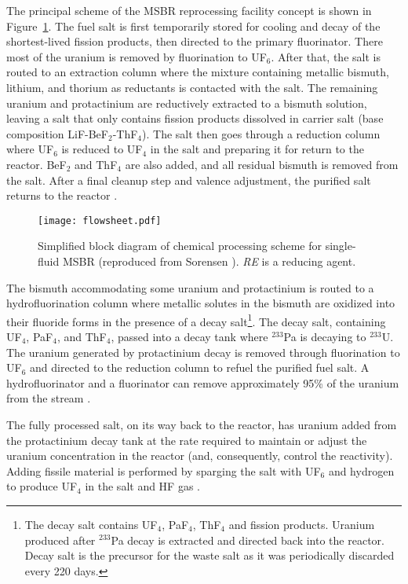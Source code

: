 The principal scheme of the \gls{MSBR} reprocessing facility concept is shown 
in Figure~\ref{fig:material_flow}. The fuel salt is first temporarily stored 
for cooling and decay of the shortest-lived fission products, then directed to 
the primary fluorinator. There most of the uranium is removed by fluorination 
to UF$_6$. After that, the salt is routed to an extraction column where the 
mixture containing metallic bismuth, lithium, and thorium as reductants is 
contacted with the salt. The remaining uranium and protactinium are 
reductively extracted to a bismuth solution, leaving a salt that only contains 
fission products dissolved in carrier salt (base composition 
LiF-BeF$_2$-ThF$_4$). The salt then goes through a reduction column where 
UF$_6$ is reduced to UF$_4$ in the salt and preparing it for return to the 
reactor. BeF$_2$ and ThF$_4$ are also added, and all residual bismuth is 
removed from the salt. After a final cleanup step and valence adjustment, the 
purified salt returns to the reactor \cite{carter_design_1972, 
sorensen_one-fluid_2006}.
\begin{figure}[htp!] %
  \centering
  \texttt{[image: flowsheet.pdf]}
  \caption{Simplified block diagram of chemical processing scheme for 
  single-fluid \gls{MSBR} (reproduced from Sorensen 
  \cite{sorensen_one-fluid_2006}). \emph{RE} is a reducing agent.}
  \label{fig:material_flow}
\end{figure}

The bismuth accommodating some uranium and protactinium is routed to a 
hydrofluorination column where metallic solutes in the bismuth are 
oxidized into their fluoride forms in the presence of a decay 
salt\footnote{The decay salt contains UF$_4$, PaF$_4$, ThF$_4$ and fission 
products. Uranium produced after $^{233}$Pa decay is extracted and directed 
back into the reactor. Decay salt is the precursor for the waste salt as it 
was periodically discarded every 220 days.}. The decay salt, containing 
UF$_4$, PaF$_4$, and ThF$_4$, passed into a decay tank where $^{233}$Pa is 
decaying to $^{233}$U. The uranium generated by protactinium decay is removed 
through fluorination to UF$_6$ and directed to the reduction column to refuel 
the purified fuel salt. A hydrofluorinator and a fluorinator can remove 
approximately 95\% of the uranium from the stream 
\cite{robertson_conceptual_1971}.

The fully processed salt, on its way back to the reactor, has uranium added 
from the protactinium decay tank at the rate required to maintain or adjust 
the uranium concentration in the reactor (and, consequently, control the 
reactivity). Adding fissile material is performed by sparging the salt with 
UF$_6$ and hydrogen to produce UF$_4$ in the salt and HF gas 
\cite{robertson_conceptual_1971}.

